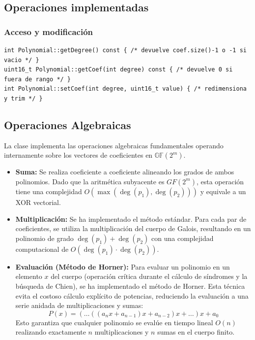 \subsection{Operaciones implementadas}

\subsubsection{Acceso y modificación}

\begin{lstlisting}[style=CodigoCPP, caption={Firma de los métodos básicos para el acceso y modificación de los coeficientes polinómicos.}, label={lst:poly_getters}]
int Polynomial::getDegree() const { /* devuelve coef.size()-1 o -1 si vacio */ }
uint16_t Polynomial::getCoef(int degree) const { /* devuelve 0 si fuera de rango */ }
int Polynomial::setCoef(int degree, uint16_t value) { /* redimensiona y trim */ }
\end{lstlisting}

\subsection{Operaciones Algebraicas}

La clase implementa las operaciones algebraicas fundamentales operando internamente sobre los vectores de coeficientes en $\mathbb{GF}(2^m)$.

\begin{itemize}
    \item \textbf{Suma:} Se realiza coeficiente a coeficiente alineando los grados de ambos polinomios. Dado que la aritmética subyacente es $GF(2^m)$, esta operación tiene una complejidad $O(\max(\deg(p_1), \deg(p_2)))$ y equivale a un XOR vectorial.
    \item \textbf{Multiplicación:} Se ha implementado el método estándar. Para cada par de coeficientes, se utiliza la multiplicación del cuerpo de Galois, resultando en un polinomio de grado $\deg(p_1) + \deg(p_2)$ con una complejidad computacional de $O(\deg(p_1) \cdot \deg(p_2))$.
    \item \textbf{Evaluación (Método de Horner):} Para evaluar un polinomio en un elemento $x$ del cuerpo (operación crítica durante el cálculo de síndromes y la búsqueda de Chien), se ha implementado el método de Horner. Esta técnica evita el costoso cálculo explícito de potencias, reduciendo la evaluación a una serie anidada de multiplicaciones y sumas:
    \begin{equation}
    P(x) = (\dots((a_n x + a_{n-1})x + a_{n-2})x + \dots )x + a_0
    \end{equation}
    Esto garantiza que cualquier polinomio se evalúe en tiempo lineal $O(n)$ realizando exactamente $n$ multiplicaciones y $n$ sumas en el cuerpo finito.
\end{itemize}

